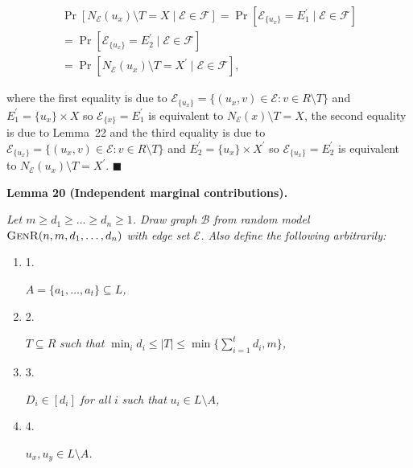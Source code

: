 \documentclass[10pt,a4paper]{article}
\begin{document}
\[\begin{gathered}
\displaystyle\Pr[N_{\mathcal{E}}(u_{x})\setminus T=X\mid\mathcal{E}\in\mathscr{F}] \displaystyle=\Pr[\mathcal{E}_{\{u_{x}\}}=E^{\prime}_{1}\mid\mathcal{E}\in\mathscr{F}] \\
\displaystyle=\Pr[\mathcal{E}_{\{u_{x}\}}=E^{\prime}_{2}\mid\mathcal{E}\in\mathscr{F}] \\
\displaystyle=\Pr[N_{\mathcal{E}}(u_{x})\setminus T=X^{\prime}\mid\mathcal{E}\in\mathscr{F}],
\end{gathered}\]


where the first equality is due to $\mathcal{E}_{\{u_{x}\}}=\{(u_{x},v)\in\mathcal{E}:v\in R\setminus T\}$ and $E^{\prime}_{1}=\{u_{x}\}\times X$ so $\mathcal{E}_{\{x\}}=E^{\prime}_{1}$ is equivalent to $N_{\mathcal{E}}(x)\setminus T=X$, the second equality is due to Lemma 22 and the third equality is due to $\mathcal{E}_{\{u_{x}\}}=\{(u_{x},v)\in\mathcal{E}:v\in R\setminus T\}$ and $E^{\prime}_{2}=\{u_{x}\}\times X^{\prime}$ so $\mathcal{E}_{\{u_{x}\}}=E^{\prime}_{2}$ is equivalent to $N_{\mathcal{E}}(u_{x})\setminus T=X^{\prime}$.
\ensuremath{\blacksquare}\par






\par\medskip\noindent\textbf{\textbf{Lemma 20}\textbf{ }(Independent marginal contributions)\textbf{.}}\par



\emph{Let $m\geq d_{1}\geq\dots\geq d_{n}\geq 1$. Draw graph $\mathcal{B}$ from random model $\textsc{GenR}(n,m,d_{1},\dots,d_{n})$ with edge set $\mathcal{E}$.
Also define the following arbitrarily:}\par


\begin{enumerate}


\item[] 1. 


$A=\{a_{1},\dots,a_{t}\}\subseteq L$\emph{,}\par




\item[] 2. 


$T\subseteq R$\emph{ such that }$\min_{i}{d_{i}}\leq|T|\leq\min\{\sum_{i=1}^{t}d_{i},m\}$\emph{,}\par




\item[] 3. 


$D_{i}\in[d_{i}]$\emph{ for all }$i$\emph{ such that }$u_{i}\in L\setminus A$\emph{,}\par




\item[] 4. 


$u_{x},u_{y}\in L\setminus A$\emph{.}\par




\end{enumerate}
\end{document}
